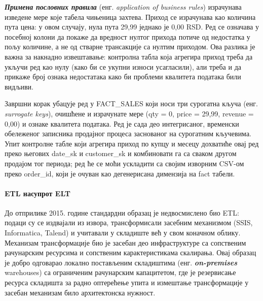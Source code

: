 \textbf{\textit{Примена пословних правила}} (енг. \textit{application of business rules}) израчунава изведене мере које табела чињеница захтева. Приход се израчунава као количина пута цена: у овом случају, нула пута 29,99 једнако је 0,00 RSD. Ред се означава у посебној колони да покаже да вредност нултог прихода потиче од недостатка у пољу количине, а не од стварне трансакције са нултим приходом. Ова разлика је важна за накнадно извештавање: контролна табла која агрегира приход треба да укључи ред као нулу (како би се укупни износи усагласили), али треба и да прикаже број ознака недостатака како би проблеми квалитета података били видљиви.

Завршни корак убацује ред у FACT\_SALES који носи три сурогатна кључа (енг. \textit{surrogate keys}), очишћене и израчунате мере (qty = 0, price = 29,99, revenue = 0,00) и ознаке квалитета података. Ред је сада део интегрисаног, временски обележеног записника продајног процеса заснованог на сурогатним кључевима. Упит контролне табле који агрегира приход по купцу и месецу дохватиће овај ред преко његових date\_sk и customer\_sk и комбиновати га са сваком другом продајом тог периода; ред ће се моћи ускладити са својим изворним CSV-ом преко order\_id, који је очуван као дегенерисана димензија на fact табели.

\paragraph{ETL насупрот ELT}
До отприлике 2015. године стандардни образац је недвосмислено био ETL: подаци су се издвајали из извора, трансформисали засебним механизмом (SSIS, Informatica, Talend) и учитавали у складиште већ у свом коначном облику. Механизам трансформације био је засебан део инфраструктуре са сопственим рачунарским ресурсима и сопственим карактеристикама скалирања. Овај образац је добро одговарао локално постављеним складиштима (енг. \textbf{\textit{on-premises}} warehouses) са ограниченим рачунарским капацитетом, где је резервисање ресурса складишта за радно оптерећење упита и измештање трансформације у засебан механизам било архитектонска нужност.

